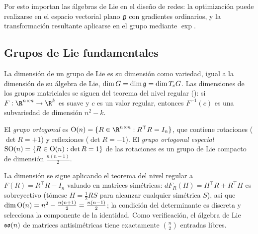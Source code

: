 Por esto importan las \'algebras de Lie en el dise\~no de redes: la optimizaci\'on
puede realizarse en el espacio vectorial plano $\mathfrak{g}$ con gradientes ordinarios,
y la transformaci\'on resultante aplicarse en el grupo mediante $\exp$.

\subsection{Grupos de Lie fundamentales}
\label{sec:found:fundamental-groups}

La dimensi\'on de un grupo de Lie es su dimensi\'on como variedad, igual a la
dimensi\'on de su \'algebra de Lie, $\dim G = \dim\mathfrak{g} = \dim T_e G$. Las
dimensiones de los grupos matriciales se siguen del teorema del nivel regular
(): si $F : \R^{n\times n} \to \R^k$ es suave y $c$ es un valor
regular, entonces $F^{-1}(c)$ es una subvariedad de dimensi\'on $n^2 - k$.

\begin{definition}
\label{def:found:orthogonal}
El \emph{grupo ortogonal} es $\Orth(n) = \{R \in \R^{n\times n} : R^\top R =
I_n\}$, que contiene rotaciones ($\det R = +1$) y reflexiones ($\det R = -1$). El
\emph{grupo ortogonal especial} $\operatorname{SO}(n) = \{R \in \operatorname{O}(n) : \det R = 1\}$ de las
rotaciones es un grupo de Lie compacto de dimensi\'on $\frac{n(n-1)}{2}$.
\end{definition}

La dimensi\'on se sigue aplicando el teorema del nivel regular a $F(R) = R^\top R -
I_n$ valuado en matrices sim\'etricas: $dF_R(H) = H^\top R + R^\top H$ es
sobreyectivo (t\'omese $H = \frac12 RS$ para alcanzar cualquier sim\'etrica $S$),
as\'i que $\dim\operatorname{O}(n) = n^2 - \frac{n(n+1)}{2} = \frac{n(n-1)}{2}$; la condici\'on
del determinante es discreta y selecciona la componente de la identidad. Como
verificaci\'on, el \'algebra de Lie $\mathfrak{so}(n)$ de matrices antisim\'etricas tiene
exactamente $\binom{n}{2}$ entradas libres.

